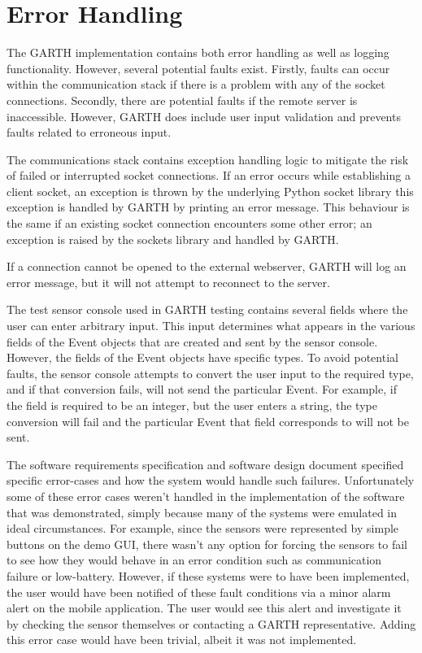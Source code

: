 \documentclass{article}
\begin{document}
\section{Error Handling}

The GARTH implementation contains both error handling as well as
logging functionality. However, several potential faults
exist. Firstly, faults can occur within the communication stack if
there is a problem with any of the socket connections. Secondly, there
are potential faults if the remote server is inaccessible. However,
GARTH does include user input validation and prevents faults related
to erroneous input.

The communications stack contains exception handling logic to mitigate
the risk of failed or interrupted socket connections. If an error
occurs while establishing a client socket, an exception is thrown by
the underlying Python socket library this exception is handled by
GARTH by printing an error message. This behaviour is the same if an
existing socket connection encounters some other error; an exception
is raised by the sockets library and handled by GARTH.

If a connection cannot be opened to the external webserver, GARTH will
log an error message, but it will not attempt to reconnect to the
server.

The test sensor console used in GARTH testing contains several fields
where the user can enter arbitrary input. This input determines what
appears in the various fields of the Event objects that are created
and sent by the sensor console. However, the fields of the Event
objects have specific types. To avoid potential faults, the sensor
console attempts to convert the user input to the required type, and
if that conversion fails, will not send the particular Event. For
example, if the field is required to be an integer, but the user
enters a string, the type conversion will fail and the particular
Event that field corresponds to will not be sent.

The software requirements specification and software design document specified
specific error-cases and how the system would handle such failures.
Unfortunately some of these error cases weren't handled in the implementation
of the software that was demonstrated, simply because many of the systems
were emulated in ideal circumstances. For example, since the sensors were
represented by simple buttons on the demo GUI, there wasn't any option for
forcing the sensors to fail to see how they would behave in an error condition
such as communication failure or low-battery. However, if these systems were to
have been implemented, the user would have been notified of these fault 
conditions via a minor alarm alert on the mobile application. The user would
see this alert and investigate it by checking the sensor themselves or
contacting a GARTH representative. Adding this error case would have been trivial,
albeit it was not implemented.
\end{document}

